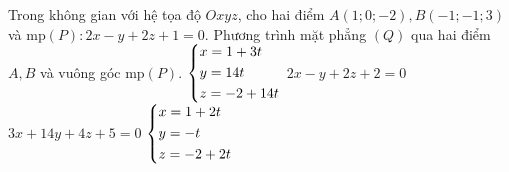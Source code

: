 \begin{ex}%
	Trong không gian với hệ tọa độ $Oxyz$, cho hai điểm  $A(1;0;-2) ,B(-1;-1;3) $ và
	mp$(P):  2x-y + 2z + 1 = 0$. Phương trình mặt phẳng $(Q)$ qua hai điểm $A, B$ và vuông góc mp$(P)$.
	\choice
	{$\left\{\begin{aligned}
			& x=1+3t \\ 
			& y=14t \\ 
			& z=-2+14t \end{aligned}\right.$    
	}
	{ $2x-y+2z+2=0$}  
	{\True $3x+14y+4z+5=0$}
	{$\left\{\begin{aligned}
			& x=1+2t \\ 
			& y=-t \\ 
			& z=-2+2t \end{aligned}\right.$ 
	}
\end{ex}

